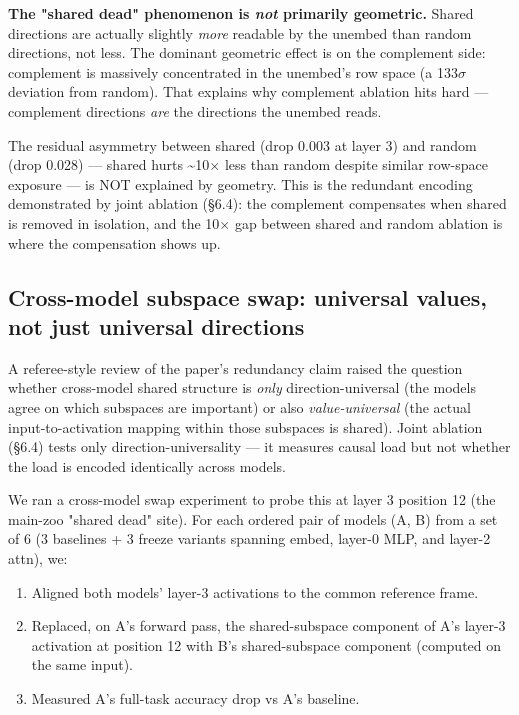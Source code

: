 \textbf{The "shared dead" phenomenon is \emph{not} primarily geometric.} Shared
directions are actually slightly \emph{more} readable by the unembed than
random directions, not less. The dominant geometric effect is on the
complement side: complement is massively concentrated in the unembed's
row space (a 133$\sigma$ deviation from random). That explains why complement
ablation hits hard --- complement directions \emph{are} the directions the
unembed reads.

The residual asymmetry between shared (drop 0.003 at layer 3) and
random (drop 0.028) --- shared hurts \textasciitilde{}10$\times$ less than random despite similar
row-space exposure --- is NOT explained by geometry. This is the redundant
encoding demonstrated by joint ablation (\S{}6.4): the complement
compensates when shared is removed in isolation, and the 10$\times$ gap between
shared and random ablation is where the compensation shows up.

\subsection{Cross-model subspace swap: universal values, not just universal directions}

A referee-style review of the paper's redundancy claim raised the question
whether cross-model shared structure is \emph{only} direction-universal (the
models agree on which subspaces are important) or also \emph{value-universal}
(the actual input-to-activation mapping within those subspaces is shared).
Joint ablation (\S{}6.4) tests only direction-universality --- it measures
causal load but not whether the load is encoded identically across models.

We ran a cross-model swap experiment to probe this at layer 3 position 12
(the main-zoo "shared dead" site). For each ordered pair of models (A, B)
from a set of 6 (3 baselines + 3 freeze variants spanning embed, layer-0
MLP, and layer-2 attn), we:

\begin{enumerate}
  \item Aligned both models' layer-3 activations to the common reference frame.
  \item Replaced, on A's forward pass, the shared-subspace component of A's layer-3 activation at position 12 with B's shared-subspace component (computed on the same input).
  \item Measured A's full-task accuracy drop vs A's baseline.
\end{enumerate}

